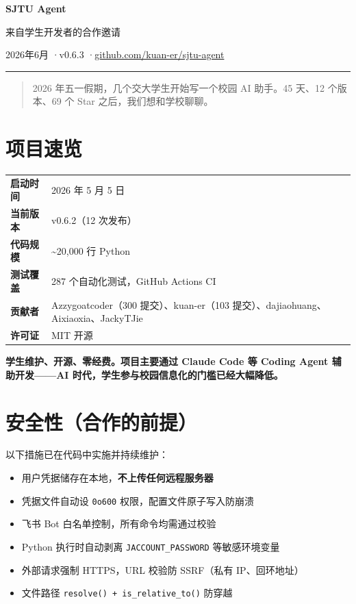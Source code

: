 \documentclass[11pt,a4paper]{ctexart}
\begin{document}
\begin{center}
    {\LARGE \textbf{SJTU Agent}}
    \vspace{0.3em}

    {\large 来自学生开发者的合作邀请}
    \vspace{0.5em}

    \small 2026年6月 \quad·\quad v0.6.3 \quad·\quad \href{https://github.com/kuan-er/sjtu-agent}{github.com/kuan-er/sjtu-agent}
\end{center}

\vspace{0.5em}
\hrule
\vspace{0.5em}

\begin{quote}\small
2026 年五一假期，几个交大学生开始写一个校园 AI 助手。45 天、12 个版本、69 个 Star 之后，我们想和学校聊聊。
\end{quote}

\section*{项目速览}

\begin{tabularx}{\textwidth}{lX}
\textbf{启动时间} & 2026 年 5 月 5 日 \\
\textbf{当前版本} & v0.6.2（12 次发布）\\
\textbf{代码规模} & \textasciitilde20,000 行 Python \\
\textbf{测试覆盖} & 287 个自动化测试，GitHub Actions CI \\
\textbf{贡献者} & Azzygoatcoder（300 提交）、kuan-er（103 提交）、dajiaohuang、Aixiaoxia、JackyTJie \\
\textbf{许可证} & MIT 开源 \\
\end{tabularx}

\vspace{0.3em}
\textbf{学生维护、开源、零经费。项目主要通过 Claude Code 等 Coding Agent 辅助开发——AI 时代，学生参与校园信息化的门槛已经大幅降低。}

\section{安全性（合作的前提）}

以下措施已在代码中实施并持续维护：
\begin{itemize}
    \item 用户凭据储存在本地，\textbf{不上传任何远程服务器}
    \item 凭据文件自动设 \texttt{0o600} 权限，配置文件原子写入防崩溃
    \item 飞书 Bot 白名单控制，所有命令均需通过校验
    \item Python 执行时自动剥离 \texttt{JACCOUNT\_PASSWORD} 等敏感环境变量
    \item 外部请求强制 HTTPS，URL 校验防 SSRF（私有 IP、回环地址）
    \item 文件路径 \texttt{resolve() + is\_relative\_to()} 防穿越
\end{itemize}
\end{document}
